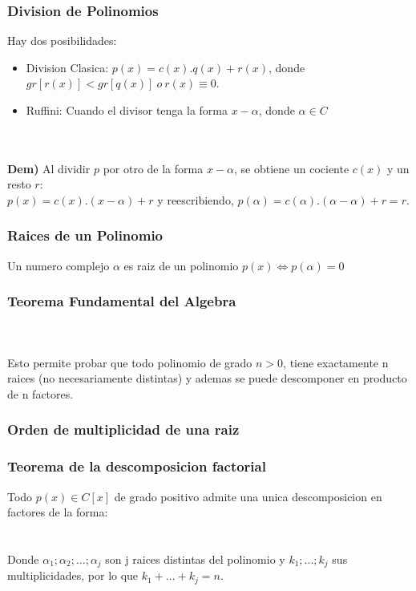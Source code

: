 \documentclass[10pt]{article}
\begin{document}
\subsubsection{Division de Polinomios}
Hay dos posibilidades:
\begin{itemize}
\item Division Clasica: $p(x)=c(x).q(x)+r(x)$, donde $gr[r(x)] < gr[q(x)]\ o\ r(x) \equiv 0$.
\item Ruffini: Cuando el divisor tenga la forma $x-\alpha$, donde $\alpha \in C$
\end{itemize}
\\ \\
\textbf{Dem)} Al dividir $p$ por otro de la forma $x-\alpha$, se obtiene un cociente $c(x)$ y un resto $r$:\\
$p(x) = c(x).(x-\alpha)+r$ y reescribiendo, $p(\alpha) = c(\alpha) . (\alpha - \alpha) + r = r$.
\subsubsection{Raices de un Polinomio}
Un numero complejo $\alpha$ es raiz de un polinomio $p(x) \iff p(\alpha)=0$\\
\subsubsection{Teorema Fundamental del Algebra}
\\ \\
Esto permite probar que todo polinomio de grado $n>0$, tiene exactamente n raices (no necesariamente distintas) y ademas se puede descomponer en producto de n factores.
\subsubsection{Orden de multiplicidad de una raiz}
\subsubsection{Teorema de la descomposicion factorial}
Todo $p(x) \in C[x]$ de grado positivo admite una unica descomposicion en factores de la forma:\\
\\ \\
Donde $\alpha_1; \alpha_2; ...; \alpha_j$ son j raices distintas del polinomio y $k_1; ...; k_j$ sus multiplicidades, por lo que $k_1+...+k_j = n$.
\end{document}
